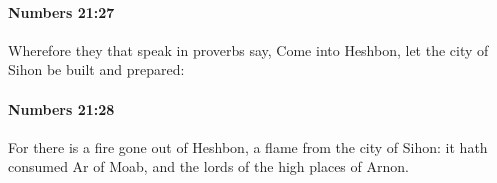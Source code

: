 		\paragraph{Numbers 21:27} %
			\label{NUMBERS-21-27}

			Wherefore they that speak in proverbs say, Come into Heshbon, let the city of Sihon be built and prepared:


		\paragraph{Numbers 21:28} %
			\label{NUMBERS-21-28}

			For there is a fire gone out of Heshbon, a flame from the city of Sihon: it hath consumed Ar of Moab, and the lords of the high places of Arnon.


